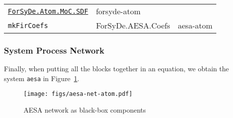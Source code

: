 \documentclass[
  a4paper,
]{article}
\newenvironment{Shaded}{}{}
\newcommand{\DataTypeTok}[1]{\textcolor[rgb]{0.56,0.13,0.00}{#1}}
\newcommand{\FunctionTok}[1]{\textcolor[rgb]{0.02,0.16,0.49}{#1}}
\newcommand{\KeywordTok}[1]{\textcolor[rgb]{0.00,0.44,0.13}{\textbf{#1}}}
\newcommand{\NormalTok}[1]{#1}
\newcommand{\OtherTok}[1]{\textcolor[rgb]{0.00,0.44,0.13}{#1}}
\begin{document}
\begin{longtable}[]{@{}lll@{}}
\begin{minipage}[t]{0.42\columnwidth}
\href{https://forsyde.github.io/forsyde-atom/api/ForSyDe-Atom-MoC-SDF.html}{\texttt{ForSyDe.Atom.MoC.SDF}}\strut
\end{minipage} & \begin{minipage}[t]{0.28\columnwidth}\raggedright
forsyde-atom\strut
\end{minipage}\tabularnewline
\begin{minipage}[t]{0.21\columnwidth}\raggedright
\texttt{mkFirCoefs}\strut
\end{minipage} & \begin{minipage}[t]{0.42\columnwidth}\raggedright
ForSyDe.AESA.Coefs\strut
\end{minipage} & \begin{minipage}[t]{0.28\columnwidth}\raggedright
aesa-atom\strut
\end{minipage}\tabularnewline
\bottomrule
\end{longtable}

\hypertarget{system-process-network}{%
\subsubsection{System Process Network}\label{system-process-network}}

Finally, when putting all the blocks together in an equation, we obtain
the system \texttt{aesa\textquotesingle{}} in
Figure~\ref{fig:aesa-net-atom}.

\begin{figure}
\hypertarget{fig:aesa-net-atom}{%
\centering
\texttt{[image: figs/aesa-net-atom.pdf]}
\caption{AESA network as black-box components}\label{fig:aesa-net-atom}
}
\end{figure}

\begin{Shaded}
\end{Shaded}
\end{document}
